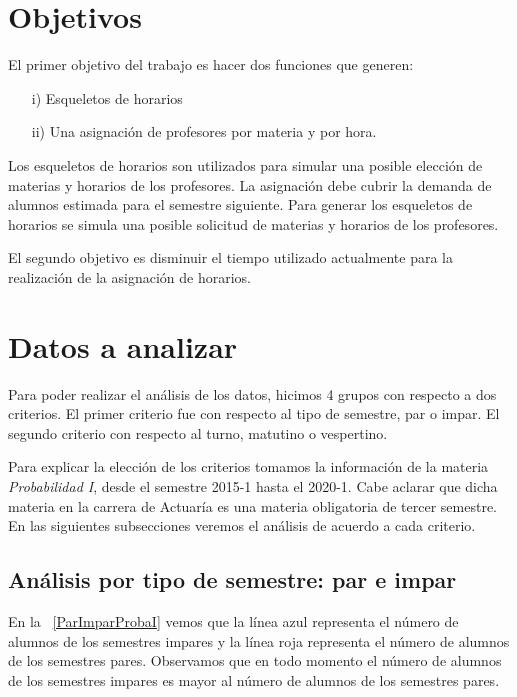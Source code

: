 \section{Objetivos}

El primer objetivo del trabajo es hacer dos funciones que generen:
  
  \begin{enumerate}
\item[i)] Esqueletos de horarios

\item[ii)] Una asignación de profesores por materia y por hora.
\end{enumerate}


Los esqueletos de horarios son utilizados para simular una posible elección de materias y horarios de los profesores. La asignación debe cubrir la demanda de alumnos estimada para el semestre siguiente. Para generar los esqueletos de horarios se simula una posible solicitud de materias y horarios de los profesores.

El segundo objetivo es disminuir el tiempo utilizado actualmente para la realización de la asignación de horarios.


\section{Datos a analizar} \label{DatosAnalizar}

Para poder realizar el análisis de los datos, hicimos 4 grupos con respecto a dos criterios. El primer criterio fue con respecto al tipo de semestre, par o impar. El segundo criterio con respecto al turno, matutino o vespertino.

Para explicar la elección de los criterios tomamos la información de la materia \textit{Probabilidad I}, desde el semestre 2015-1 hasta el 2020-1. Cabe aclarar que dicha materia en la carrera de Actuaría es una materia obligatoria de tercer semestre. En las siguientes subsecciones veremos el análisis de acuerdo a cada criterio.

\subsection{Análisis por tipo de semestre: par e impar}

En la \figurename{~\ref{ParImparProbaI}} vemos que la línea azul representa el número de alumnos de los semestres impares y la línea roja representa el número de alumnos de los semestres pares. Observamos que en todo momento el número de alumnos de los semestres impares es mayor al número de alumnos de los semestres pares.

